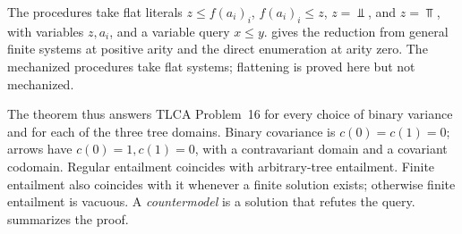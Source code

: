 The procedures take flat literals
$z\le f(a_i)_i$, $f(a_i)_i\le z$, $z=\Bot$, and $z=\Top$, with variables
$z,a_i$, and a variable query $x\le y$.
 gives the reduction from general finite systems
at positive arity and the direct enumeration at arity zero. The mechanized
procedures take flat systems; flattening is proved here but not mechanized.

The theorem thus answers TLCA Problem~16 for every choice of binary
variance and for each of the three tree domains. Binary covariance is
$c(0)=c(1)=0$; arrows have $c(0)=1,c(1)=0$, with a contravariant domain
and a covariant codomain. Regular entailment coincides with arbitrary-tree
entailment. Finite entailment also coincides with it whenever a finite
solution exists; otherwise finite entailment is vacuous.
A \emph{countermodel} is a solution that refutes the query.
 summarizes the proof.

